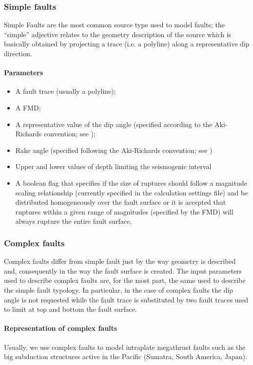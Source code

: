 \subsubsection{Simple faults}
%
Simple Faults are the most common source type used to model faults; the 
``simple'' adjective relates to the geometry description of the source 
which is basically obtained by projecting a trace (i.e. a polyline) along a representative dip direction. 
%
\paragraph{Parameters}
%
\begin{itemize}
\item A fault trace (usually a polyline); 
\item A FMD;
\item A representative value of the dip angle (specified according to the Aki-Richards convention; see \citet{aki2002});
\item Rake angle (specified following the Aki-Richards convention; see \citet{aki2002}) 
\item Upper and lower values of depth limiting the seismogenic interval 
\item A boolean flag that specifies if the size of ruptures should follow a magnitude scaling relationship (currently specified in the calculation settings file) and be distributed homogeneously over the fault surface or it is accepted that ruptures within a given range of magnitudes (specified by the FMD) will always rupture the entire fault surface.
\end{itemize}
%
\subsubsection{Complex faults}
%
Complex faults  differ from simple fault just by the way geometry is described and, consequently in the way the fault surface is created. The input parameters used to describe complex faults are, for the most part, the same used to describe the simple fault typology. In particular, in the case of complex faults the dip angle is not requested while the fault trace is substituted by two fault traces used to limit at top and bottom the fault surface. 
%
\paragraph{Representation of complex faults}
%
Usually, we use complex faults to model intraplate megathrust faults such as the 
big subduction structures active in the Pacific (Sumatra, South America, Japan).

